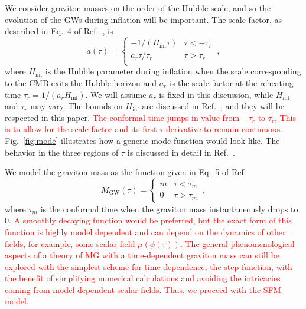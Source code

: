 \documentclass[prd,twocolumn,aps,psfig,nofootinbib,nobibnotes,superscriptaddress,preprintnumbers,times]{revtex4-2}
\def\red{\textcolor{red}}
\begin{document}
We consider graviton masses on the order of the Hubble scale, and so the evolution of the GWs during inflation will be important.
The scale factor, as described in Eq.\ 4 of Ref.\ \cite{Fujita:2018ehq}, is
\begin{equation}\label{eqn:scale_fac}
    a(\tau) = 
    \begin{cases}
        -1/(H_{\inf}\tau) & \tau < -\tau_r \\
        a_r \tau/\tau_r & \tau > \tau_r \\
   \end{cases} \ ,
\end{equation}
where $H_{\inf}$ is the Hubble parameter during inflation when the scale corresponding to the CMB exits the Hubble horizon and $a_r$ is the scale factor at the reheating time $\tau_r = 1/(a_r H_{\inf})$. We will assume $a_r$ is fixed in this discussion, while $H_{\inf}$ and $\tau_r$ may vary. The bounds on $H_{\inf}$ are discussed in Ref.\ \cite{Jiang:2015qor}, and they will be respected in this paper. \red{The conformal time jumps in value from $-\tau_r$ to $\tau_r$, This is to allow for the scale factor and its first $\tau$ derivative to remain continuous.} Fig.\ \ref{fig:mode} illustrates how a generic mode function would look like. The behavior in the three regions of $\tau$ is discussed in detail in Ref.\ \cite{Fujita:2018ehq}.

We model the graviton mass as the function given in Eq.\ 5 of Ref.\ \cite{Fujita:2018ehq}
\begin{equation}\label{eqn:mass_case}
    M_\text{GW}(\tau) = 
    \begin{cases}
        m & \tau < \tau_m \\
        0 & \tau > \tau_m
   \end{cases} \ ,
\end{equation} 
where $\tau_m$ is the conformal time when the graviton mass instantaneously drops to 0. \red{A smoothly decaying function would be preferred, but the exact form of this function is highly model dependent and can depend on the dynamics of other fields, for example, some scalar field $\mu(\phi(\tau))$. The general phenomenological aspects of a theory of MG with a time-dependent graviton mass can still be explored with the simplest scheme for time-dependence, the step function, with the benefit of simplifying numerical calculations and avoiding the intricacies coming from model dependent scalar fields. Thus, we proceed with the SFM model.}
\end{document}
